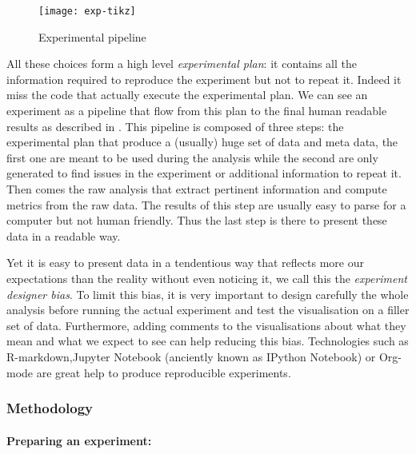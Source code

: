 \begin{figure}[htb]
    \centering
    \texttt{[image: exp-tikz]}
    \caption{Experimental pipeline}
    \label{fig:exp-pipeline}
\end{figure}

All these choices form a high level \emph{experimental plan}: it contains all
the information required to reproduce the experiment but not to repeat it.
Indeed it miss the code that actually execute the experimental plan.
We can see an experiment as a pipeline that flow from this plan to the final
human readable results as described in . This pipeline is
composed of three steps: the experimental plan that produce a (usually) huge
set of data and meta data, the first one are meant to be used during the
analysis while the second are only generated to find issues in the experiment or
additional information to repeat it. Then comes the raw analysis that extract
pertinent information and compute metrics from the raw data. The results of
this step are usually easy to parse for a computer but not human friendly.
Thus the last step is there to present these data in a readable way.

Yet it is easy to present data in a tendentious way that reflects more our
expectations than the reality without even noticing it, we call this the
\emph{experiment designer bias}. To limit this bias,
it is very important to design carefully the whole analysis before running the
actual experiment and test the visualisation on a filler set of data.
Furthermore, adding comments to the visualisations about what they mean and
what we expect to see can help reducing this bias. Technologies such as
\gls{R-markdown},Jupyter Notebook (anciently known as IPython
Notebook) or \gls{Org-mode} are great help to produce reproducible
experiments.

\subsubsection{Methodology}

\paragraph{Preparing an experiment:}

